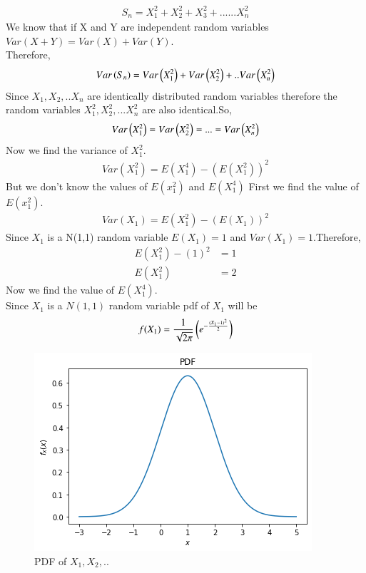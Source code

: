 \documentclass[journal,12pt,twocolumn]{IEEEtran}
\begin{document}
\begin{align}
    S_{n}=X_{1}^2+X_{2}^2+X_{3}^2+......X_{n}^2
\end{align}
We know that if X and Y are independent random variables $Var(X+Y)=Var(X)+Var(Y)$.
\\Therefore,
\begin{align}
    Var\left(S_{n}\right)=Var\left(X_{1}^2\right)+Var\left(X_{2}^2\right)+..Var\left(X_{n}^2\right)
\end{align}
Since $X_{1},X_{2},..X_{n}$ are identically distributed random variables therefore the random variables $X_{1}^2,X_{2}^2,...X_{n}^2$ are also identical.So,
\begin{align}
    Var\left(X_{1}^2\right)=Var\left(X_{2}^2\right)=...=Var\left(X_{n}^2\right)
\end{align}
Now we find the variance of $X_{1}^2$.
\begin{align}
    Var(X_{1}^2)=E(X_{1}^4)-(E(X_{1}^2))^2
\end{align}
But we don't know the values of $E(x_{1}^2)$ and $E(X_{1}^4)$
First we find the value of $E(x_{1}^2)$. 
\begin{align}
    Var(X_{1})=E(X_{1}^2)-(E(X_{1}))^2
\end{align}
Since $X_{1}$ is a N(1,1) random variable $E(X_{1})=1$ and $Var(X_{1})=1$.Therefore,
\begin{align}
    E(X_{1}^2)-(1)^2&=1
 \\  E(X_{1}^2)&=2
\end{align}
Now we find the value of $E(X_{1}^4)$.
\\Since $X_{1}$ is a $N(1,1)$ random variable pdf of $X_{1}$ will be 
\begin{align}
    f(X_{1})=\frac{1}{\sqrt{2\pi}}\left(e^{-\frac{(X_{1}-1)^2}{2}}\right)
\end{align}
\begin{figure}[h]
    \centering
    \includegraphics[width=\columnwidth]{PDF.png}
    \caption{PDF of $X_{1},X_{2},..$}
    \label{fig:my_label}
\end{figure}
\end{document}
